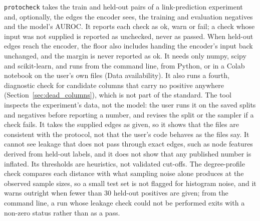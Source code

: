 \documentclass[review]{elsarticle}
\begin{document}


\texttt{protocheck} takes the train and held-out pairs of a link-prediction experiment and, optionally, the edges the encoder sees, the training and evaluation negatives and the model's AUROC. It reports each check as ok, warn or fail; a check whose input was not supplied is reported as unchecked, never as passed. When held-out edges reach the encoder, the floor also includes handing the encoder's input back unchanged, and the margin is never reported as ok. It needs only numpy, scipy and scikit-learn, and runs from the command line, from Python, or in a Colab notebook on the user's own files (Data availability). It also runs a fourth, diagnostic check for candidate columns that carry no positive anywhere (Section~\ref{sec:dead_columns}), which is not part of the standard. The tool inspects the experiment's data, not the model: the user runs it on the saved splits and negatives before reporting a number, and revises the split or the sampler if a check fails. It takes the supplied edges as given, so it shows that the files are consistent with the protocol, not that the user's code behaves as the files say. It cannot see leakage that does not pass through exact edges, such as node features derived from held-out labels, and it does not show that any published number is inflated. Its thresholds are heuristics, not validated cut-offs. The degree-profile check compares each distance with what sampling noise alone produces at the observed sample sizes, so a small test set is not flagged for histogram noise, and it warns outright when fewer than 30 held-out positives are given; from the command line, a run whose leakage check could not be performed exits with a non-zero status rather than as a pass.
\end{document}
